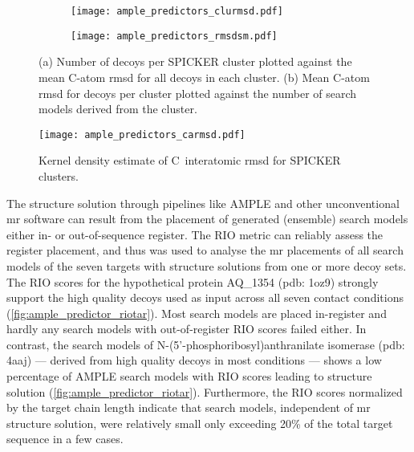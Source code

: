 \begin{figure}[H]
    \centering
    \begin{subfigure}[b]{\textwidth}
        \texttt{[image: ample\_predictors\_clurmsd.pdf]}
        \caption{}
        \label{fig:ample_predictor_clurmsd}
    \end{subfigure}
    \begin{subfigure}[b]{\textwidth}
        \texttt{[image: ample\_predictors\_rmsdsm.pdf]}
        \caption{}
        \label{fig:ample_predictor_rmsdsm}
    \end{subfigure}

    \caption{(a) Number of decoys per SPICKER cluster plotted against the mean C\textalpha-atom \gls{rmsd} for all decoys in each cluster. (b) Mean C\textalpha-atom \gls{rmsd} for decoys per cluster plotted against the number of search models derived from the cluster.}
\end{figure}

\begin{figure}[H]
    \centering
    \texttt{[image: ample\_predictors\_carmsd.pdf]}
    \caption{Kernel density estimate of C\textalpha\ interatomic \gls{rmsd} for SPICKER clusters.}
    \label{fig:ample_predictor_carmsd}
\end{figure}

The structure solution through pipelines like AMPLE and other unconventional \gls{mr} software \cite{Rodriguez2012-ad,Sammito2013-ug} can result from the placement of generated (ensemble) search models either in- or out-of-sequence register. The RIO metric \cite{Thomas2015-wu} can reliably assess the register placement, and thus was used to analyse the \gls{mr} placements of all search models of the seven targets with structure solutions from one or more decoy sets. The RIO scores for the hypothetical protein AQ\_1354 (\gls{pdb}: 1oz9) strongly support the high quality decoys used as input across all seven contact conditions (\cref{fig:ample_predictor_riotar}). Most search models are placed in-register and hardly any search models with out-of-register RIO scores failed either. In contrast, the search models of N-(5’-phosphoribosyl)anthranilate isomerase (\gls{pdb}: 4aaj) --- derived from high quality decoys in most conditions --- shows a low percentage of AMPLE search models with RIO scores leading to structure solution (\cref{fig:ample_predictor_riotar}). Furthermore, the RIO scores normalized by the target chain length indicate that search models, independent of \gls{mr} structure solution, were relatively small only exceeding 20\% of the total target sequence in a few cases. 

